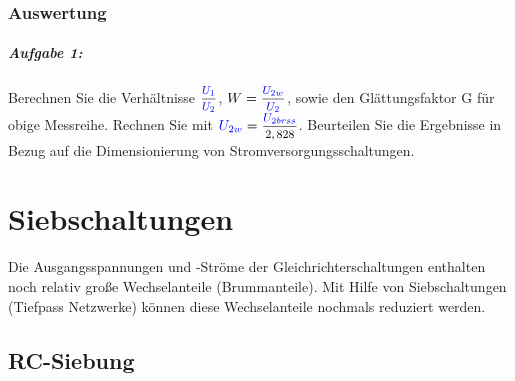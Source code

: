 \documentclass[11pt,a4paper,titlepage]{scrreprt}
\begin{document}
			\subsection{Auswertung}
			\paragraph{Aufgabe 1:}  Berechnen Sie die Verhältnisse $\mfrac{\spannung{U_1}}{\spannung{U_2}}$, $W =\mfrac{\spannung{U_{2w}}}{\spannung{U_2}}$, sowie den Glättungsfaktor G für obige Messreihe. Rechnen Sie mit $\spannung{U_{2w}} = \mfrac{\spannung{U_{2brss}}}{2,828}$. Beurteilen Sie die Ergebnisse in Bezug auf die Dimensionierung von Stromversorgungsschaltungen.\\
            
            
	\chapter{Siebschaltungen}
    Die Ausgangsspannungen und -Ströme der Gleichrichterschaltungen enthalten noch relativ große Wechselanteile (Brummanteile). Mit Hilfe von Siebschaltungen (Tiefpass Netzwerke) können diese Wechselanteile nochmals reduziert werden.
    	\section{RC-Siebung}
\end{document}
